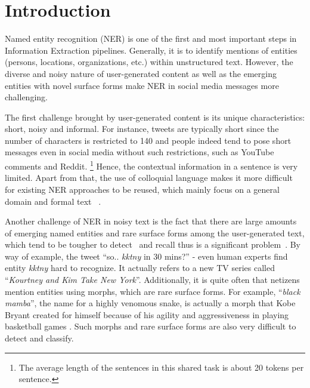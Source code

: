 \section{Introduction}
\label{sec:intro}
Named entity recognition (NER) is one of the first and most important steps in Information Extraction pipelines. 
Generally, it is to identify mentions of entities (persons, locations, organizations, etc.)
within unstructured text. 
However, the diverse and noisy nature of user-generated content as well as the emerging entities with novel surface forms make NER in social media messages more challenging.

The first challenge brought by user-generated content
is its unique characteristics: short, noisy and informal. 
For instance, tweets are typically short since the number of characters is restricted to 140 and people indeed tend to pose short messages even in social media without such restrictions, such as YouTube comments and Reddit.
\footnote{The average length of the sentences in this shared task is about 20 tokens per sentence.}
Hence, the contextual information in a sentence is very limited.
Apart from that, 
the use of colloquial language makes it more difficult for existing NER approaches to be reused, which mainly focus on a general domain and formal text ~\cite{baldwin2015shared, derczynski2015analysis}. 

Another challenge of NER in noisy text is the fact that there are large amounts of emerging named entities and rare surface forms among the user-generated text, which tend to be tougher to detect~\cite{augenstein2017generalisation} and recall thus is a significant problem~\cite{derczynski2015analysis}.
By way of example, the tweet ``so.. \textit{kktny} in 30 mins?'' - even human experts find entity \textit{kktny} hard to recognize. 
It actually refers to a new TV series called ``\textit{Kourtney and Kim Take New York}''. 
Additionally, it is quite often that netizens mention entities using morphs, which are rare surface forms. 
For example, ``\textit{black mamba}'', the name for a
highly venomous snake, is actually a morph that
Kobe Bryant created for himself because of his
agility and aggressiveness in playing basketball
games \cite{DBLP:conf/acl/ZhangHPLLJKWSHY15}.
Such morphs and rare surface forms are also very difficult to detect and classify. 

